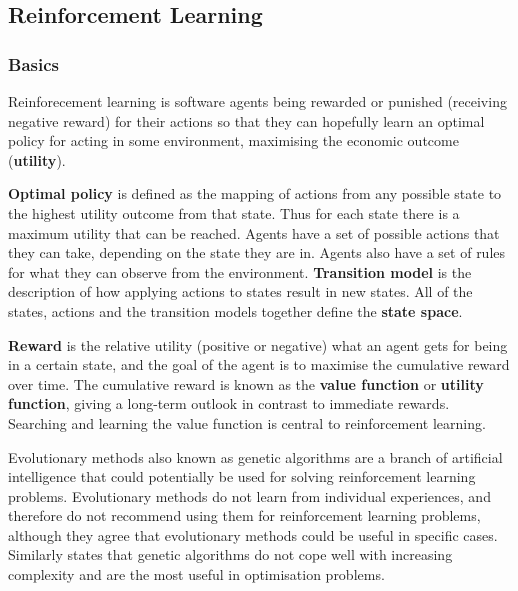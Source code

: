 \subsection{Reinforcement Learning}
\label{sec:ai}

\subsubsection{Basics}
\label{sec:ai:basics}

Reinforecement learning is software agents being rewarded or punished
(receiving negative reward) for their actions so that they can hopefully learn
an optimal policy for acting in some environment, maximising the economic
outcome (\textbf{utility}).

\textbf{Optimal policy} is defined as the mapping of actions from any possible
state to the highest utility outcome from that state. Thus for each state there
is a maximum utility that can be reached. Agents have a set of possible actions
that they can take, depending on the state they are in. Agents also have a set
of rules for what they can observe from the environment. \textbf{Transition
model} is the description of how applying actions to states result in new
states. All of the states, actions and the transition models together define
the \textbf{state space}. \parencite{Russell2010ai+modern,
Sutton1998ai+reinforcement}

\textbf{Reward} is the relative utility (positive or negative) what an agent
gets for being in a certain state, and the goal of the agent is to maximise the
cumulative reward over time. The cumulative reward is known as the
\textbf{value function} or \textbf{utility function}, giving a long-term
outlook in contrast to immediate rewards. Searching and learning the value
function is central to reinforcement learning. \parencite{Russell2010ai+modern,
Sutton1998ai+reinforcement}

Evolutionary methods \parencite{Sutton1998ai+reinforcement} also known as
genetic algorithms \parencite{Russell2010ai+modern} are a branch of artificial
intelligence that could potentially be used for solving reinforcement learning
problems. Evolutionary methods do not learn from individual experiences, and
therefore \textcite{Sutton1998ai+reinforcement} do not recommend using them for
reinforcement learning problems, although they agree that evolutionary methods
could be useful in specific cases. Similarly \textcite{Russell2010ai+modern}
states that genetic algorithms do not cope well with increasing complexity and
are the most useful in optimisation problems.



